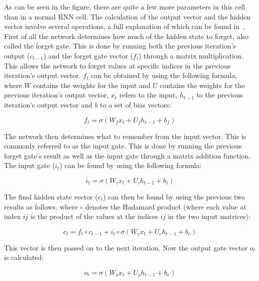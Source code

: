 As can be seen in the figure, there are quite a few more parameters in this cell than in a normal RNN cell. The calculation of the output vector and the hidden vector involve several operations, a full explanation of which can be found in~\cite{olah2015understanding}. First of all the network determines how much of the hidden state to forget, also called the forget gate. This is done by running both the previous iteration's output (\(c_{t-1}\)) and the forget gate vector (\(f_t\)) through a matrix multiplication. This allows the network to forget values at specific indices in the previous iteration's output vector. \(f_t\) can be obtained by using the following formula, where \(W\) contains the weights for the input and \(U\) contains the weights for the previous iteration's output vector, \(x_t\) refers to the input, \(h_{t-1}\) to the previous iteration's output vector and \(b\) to a set of bias vectors:

\begin{equation} \label{eq:something}
f_t = \sigma(W_f x_t + U_f h_{t-1} + b_f)
\end{equation}

The network then determines what to remember from the input vector. This is commonly referred to as the input gate. This is done by running the previous forget gate's result as well as the input gate through a matrix addition function. The input gate (\(i_t\)) can be found by using the following formula:

\begin{equation} \label{eq:something}
i_t = \sigma(W_i x_t + U_i h_{t-1} + b_i)
\end{equation}

The final hidden state vector (\(c_t\)) can then be found by using the previous two results as follows, where \(\circ \) denotes the Hadamard product (where each value at index \(ij\) is the product of the values at the indices \(ij\) in the two input matrices): 

\begin{equation} \label{eq:something}
c_t = f_t \circ c_{t-1} + i_t \circ \sigma(W_c x_t + U_c h_{t-1} + b_c)
\end{equation}

This vector is then passed on to the next iteration. Now the output gate vector \(o_t\) is calculated:

\begin{equation} \label{eq:something}
o_t = \sigma(W_o x_t + U_o h_{t-1} + b_o)
\end{equation}

